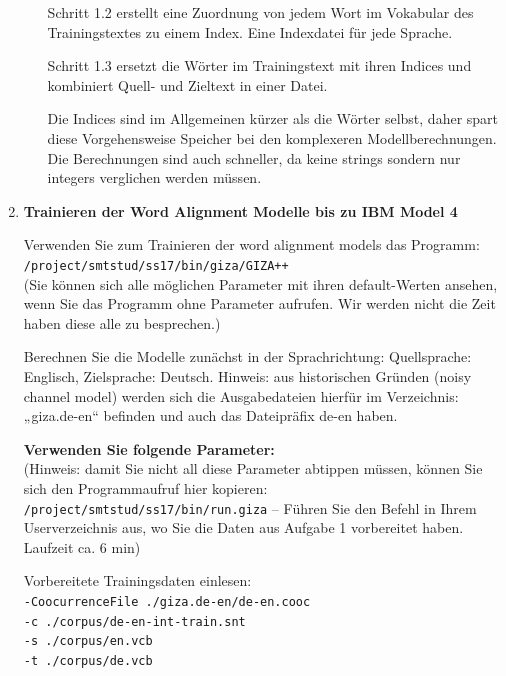 \documentclass[12pt,fleqn]{article}
\begin{document}
\begin{enumerate}
\begin{enumerate}
\vspace{0.5cm} 
Schritt 1.2 erstellt eine Zuordnung von jedem Wort im Vokabular des Trainingstextes zu einem Index. Eine Indexdatei für jede Sprache.

\vspace{0.5cm} 
Schritt 1.3 ersetzt die Wörter im Trainingstext mit ihren Indices und kombiniert Quell- und Zieltext in einer Datei.

\vspace{0.5cm} 
Die Indices sind im Allgemeinen kürzer als die Wörter selbst, daher spart diese Vorgehensweise Speicher bei den komplexeren Modellberechnungen. Die Berechnungen sind auch schneller, da keine strings sondern nur integers verglichen werden müssen.


\end{enumerate} 

\vspace{0.5cm} 
\item \textbf{Trainieren der Word Alignment Modelle bis zu IBM Model 4} 

\vspace{0.5cm} 
Verwenden Sie zum Trainieren der word alignment models das Programm: \\ 

\texttt{/project/smtstud/ss17/bin/giza/GIZA++ } \\ 

(Sie können sich alle möglichen Parameter mit ihren default-Werten ansehen, wenn Sie das Programm ohne Parameter aufrufen. Wir werden nicht die Zeit haben diese alle zu besprechen.)

\vspace{0.5cm} 
Berechnen Sie die Modelle zunächst in der Sprachrichtung: Quellsprache: Englisch, Zielsprache: Deutsch. 
Hinweis: aus historischen Gründen (noisy channel model) werden sich die Ausgabedateien hierfür im Verzeichnis: „giza.de-en“ befinden und auch das Dateipräfix de-en haben.

\vspace{0.5cm} 

\textbf{Verwenden Sie folgende Parameter:} \\ 

(Hinweis: damit Sie nicht all diese Parameter abtippen müssen, können Sie sich den Programmaufruf hier kopieren: \texttt{/project/smtstud/ss17/bin/run.giza} – Führen Sie den Befehl in Ihrem Userverzeichnis aus, wo Sie die Daten aus Aufgabe 1 vorbereitet haben. Laufzeit ca. 6 min)


\vspace{0.5cm} 
Vorbereitete Trainingsdaten einlesen: \\
\texttt{-CoocurrenceFile	./giza.de-en/de-en.cooc}\\
\texttt{-c			./corpus/de-en-int-train.snt}\\
\texttt{-s 			./corpus/en.vcb} \\
\texttt{-t 			./corpus/de.vcb}\\



\end{enumerate}
\end{document}
